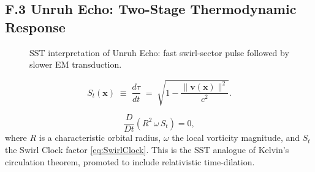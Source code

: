 \documentclass[11pt]{article}
\begin{document}
        \subsection*{F.3 Unruh Echo: Two-Stage Thermodynamic Response}

            \begin{figure}[h!]
                \centering
                \caption{SST interpretation of Unruh Echo: fast swirl-sector pulse followed by
                slower EM transduction.}
            \end{figure}


            \newcommand{\kb}{k_{\mathrm{B}}}
            \newcommand{\hbarc}{\hbar}
            \newcommand{\cLight}{c}

            \newcommand{\vloc}{\mathbf{v}(\mathbf{x})}

            \begin{equation}
                S_t(\mathbf{x})
                \;\equiv\;
                \frac{d\tau}{dt}
                \;=\;
                \sqrt{1 - \frac{\lVert \vloc \rVert^2}{\cLight^2}}.
                \label{eq:SwirlClock}
            \end{equation}

            \begin{equation}
                \frac{D}{Dt}\!\left( R^2 \,\omega\, S_t \right) = 0,
                \label{eq:ChronosKelvin}
            \end{equation}
            where \(R\) is a characteristic orbital radius, \(\omega\) the local vorticity magnitude,
            and \(S_t\) the Swirl Clock factor \eqref{eq:SwirlClock}. This is the SST analogue of
            Kelvin’s circulation theorem, promoted to include relativistic time-dilation.
\end{document}
